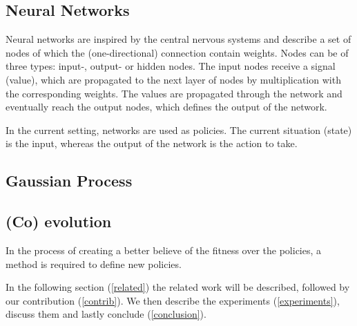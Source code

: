 \subsection{Neural Networks}
Neural networks are inspired by the central nervous systems and describe a set of nodes of which the (one-directional) connection contain weights. Nodes can be of three types: input-, output- or hidden nodes. The input nodes receive a signal (value), which are propagated to the next layer of nodes by multiplication with the corresponding weights. The values are propagated through the network and eventually reach the output nodes, which defines the output of the network. 

In the current setting, networks are used as policies. The current situation (state) is the input, whereas the output of the network is the action to take. 

\subsection{Gaussian Process}

\subsection{(Co) evolution}
In the process of creating a better believe of the fitness over the policies, a method is required to define new policies. 


In the following section (\ref{related}) the related work will be described, followed by our contribution (\ref{contrib}). We then describe the experiments (\ref{experiments}), discuss them and lastly conclude (\ref{conclusion}).

